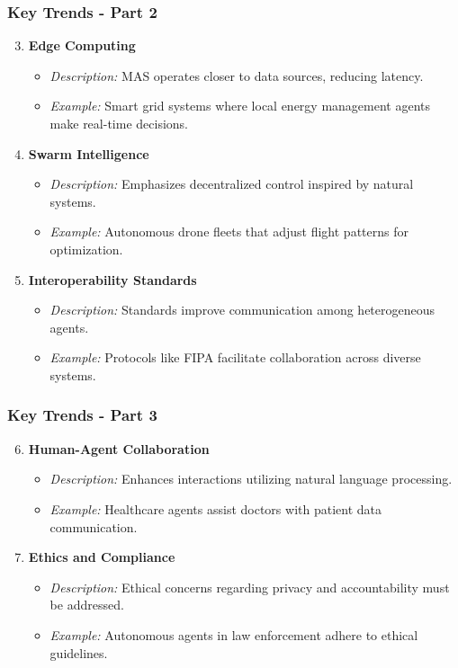 \documentclass[aspectratio=169]{beamer}
\begin{document}
\begin{frame}[fragile]
    \frametitle{Key Trends - Part 2}
    \begin{enumerate}
        \setcounter{enumi}{2}
        \item \textbf{Edge Computing}
            \begin{itemize}
                \item \textit{Description:} MAS operates closer to data sources, reducing latency.
                \item \textit{Example:} Smart grid systems where local energy management agents make real-time decisions.
            \end{itemize}

        \item \textbf{Swarm Intelligence}
            \begin{itemize}
                \item \textit{Description:} Emphasizes decentralized control inspired by natural systems.
                \item \textit{Example:} Autonomous drone fleets that adjust flight patterns for optimization.
            \end{itemize}

        \item \textbf{Interoperability Standards}
            \begin{itemize}
                \item \textit{Description:} Standards improve communication among heterogeneous agents.
                \item \textit{Example:} Protocols like FIPA facilitate collaboration across diverse systems.
            \end{itemize}
    \end{enumerate}
\end{frame}

\begin{frame}[fragile]
    \frametitle{Key Trends - Part 3}
    \begin{enumerate}
        \setcounter{enumi}{5}
        \item \textbf{Human-Agent Collaboration}
            \begin{itemize}
                \item \textit{Description:} Enhances interactions utilizing natural language processing.
                \item \textit{Example:} Healthcare agents assist doctors with patient data communication.
            \end{itemize}

        \item \textbf{Ethics and Compliance}
            \begin{itemize}
                \item \textit{Description:} Ethical concerns regarding privacy and accountability must be addressed.
                \item \textit{Example:} Autonomous agents in law enforcement adhere to ethical guidelines.
            \end{itemize}
    \end{enumerate}
\end{frame}
\end{document}
